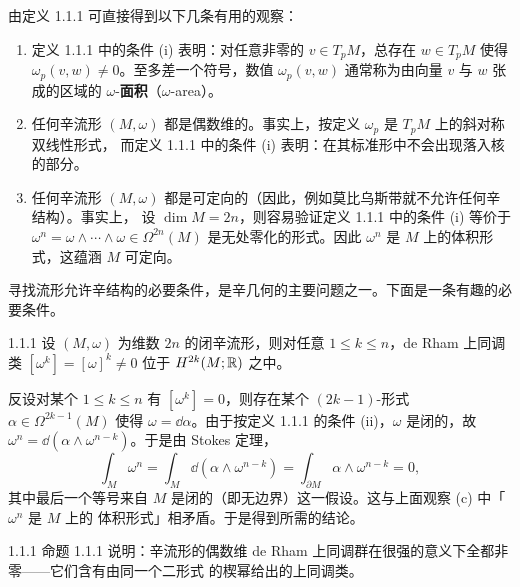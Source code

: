由定义 1.1.1 可直接得到以下几条有用的观察：

\begin{enumerate}[label=(\alph*)]
  \item 定义 1.1.1 中的条件 (i) 表明：对任意非零的 $v\in T_pM$，总存在 $w\in T_pM$ 使得
        $\omega_p(v,w)\neq0$。至多差一个符号，数值 $\omega_p(v,w)$ 通常称为由向量 $v$ 与 $w$
        张成的区域的 $\omega$-\textbf{面积}（$\omega$-area）。
  \item 任何辛流形 $(M,\omega)$ 都是偶数维的。事实上，按定义 $\omega_p$ 是 $T_pM$ 上的斜对称双线性形式，
        而定义 1.1.1 中的条件 (i) 表明：在其标准形中不会出现落入核的部分。
  \item 任何辛流形 $(M,\omega)$ 都是可定向的（因此，例如莫比乌斯带就不允许任何辛结构）。事实上，
        设 $\dim M=2n$，则容易验证定义 1.1.1 中的条件 (i) 等价于
        $\omega^n=\omega\wedge\cdots\wedge\omega\in\Omega^{2n}(M)$
        是无处零化的形式。因此 $\omega^n$ 是 $M$ 上的体积形式，这蕴涵 $M$ 可定向。
\end{enumerate}

寻找流形允许辛结构的必要条件，是辛几何的主要问题之一。下面是一条有趣的必要条件。

\begin{wprop}{1.1.1}
设 $(M,\omega)$ 为维数 $2n$ 的闭辛流形，则对任意 $1\le k\le n$，de Rham 上同调类
$[\omega^k]=[\omega]^k\neq0$ 位于 $H^{2k}(M;\mathbb{R})$ 之中。
\end{wprop}

\begin{wproof}
反设对某个 $1\le k\le n$ 有 $[\omega^k]=0$，则存在某个 $(2k-1)$-形式 $\alpha\in\Omega^{2k-1}(M)$
使得 $\omega=\dd\alpha$。由于按定义 1.1.1 的条件 (ii)，$\omega$ 是闭的，故
$\omega^n=\dd(\alpha\wedge\omega^{n-k})$。于是由 Stokes 定理，
\[
  \int_M\omega^n=\int_M\dd(\alpha\wedge\omega^{n-k})
  =\int_{\partial M}\alpha\wedge\omega^{n-k}=0,
\]
其中最后一个等号来自 $M$ 是闭的（即无边界）这一假设。这与上面观察 (c) 中「$\omega^n$ 是 $M$ 上的
体积形式」相矛盾。于是得到所需的结论。
\end{wproof}

\begin{wrem}{1.1.1}
命题 1.1.1 说明：辛流形的偶数维 de Rham 上同调群在很强的意义下全都非零——它们含有由同一个二形式
的楔幂给出的上同调类。
\end{wrem}

